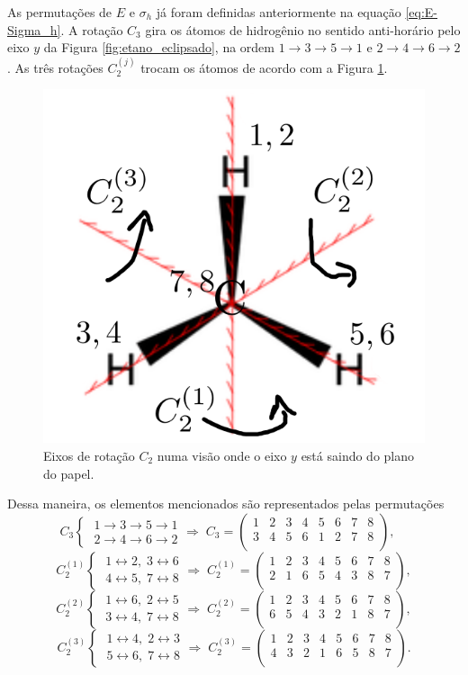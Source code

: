 \documentclass[a4paper,10pt]{article}
\newcommand{\lr}{\leftrightarrow}
\begin{document}
As permutações de $E$ e $\sigma_h$ já foram definidas anteriormente na equação \ref{eq:E-Sigma_h}. A rotação $C_3$ gira os átomos de hidrogênio no sentido anti-horário pelo eixo $y$ da Figura \ref{fig:etano_eclipsado}, na ordem $1 \to 3 \to 5 \to 1$ e $2 \to 4 \to 6 \to 2$. As três rotações $C_2^{(j)}$ trocam os átomos de acordo com a Figura \ref{fig:C2_eclipsado}.
\begin{figure}[H]
\centering
\includegraphics[width=0.3\linewidth]{fig/C2_eclipsado.png}
\caption{Eixos de rotação $C_2$ numa visão onde o eixo $y$ está saindo do plano do papel.}
\label{fig:C2_eclipsado}
\end{figure}

Dessa maneira, os elementos mencionados são representados pelas permutações
$$
C_3
\begin{cases}
\; 1 \to 3 \to 5 \to 1 \\
\; 2 \to 4 \to 6 \to 2
\end{cases}
\Rightarrow \;
C_3 =
\begin{pmatrix}
1 & 2 & 3 & 4 & 5 & 6 & 7 & 8 \\
3 & 4 & 5 & 6 & 1 & 2 & 7 & 8 \\
\end{pmatrix}, \quad
$$
$$
C_2^{(1)}
\begin{cases}
\; 1 \lr 2, \; 3 \lr 6 \\
\; 4 \lr 5, \; 7 \lr 8
\end{cases}
\Rightarrow \;
C_2^{(1)} =
\begin{pmatrix}
1 & 2 & 3 & 4 & 5 & 6 & 7 & 8 \\
2 & 1 & 6 & 5 & 4 & 3 & 8 & 7 \\
\end{pmatrix},
$$
$$
C_2^{(2)}
\begin{cases}
\; 1 \lr 6, \; 2 \lr 5 \\
\; 3 \lr 4, \; 7 \lr 8
\end{cases}
\Rightarrow \;
C_2^{(2)} =
\begin{pmatrix}
1 & 2 & 3 & 4 & 5 & 6 & 7 & 8 \\
6 & 5 & 4 & 3 & 2 & 1 & 8 & 7 \\
\end{pmatrix},
$$
$$
C_2^{(3)}
\begin{cases}
\; 1 \lr 4, \; 2 \lr 3 \\
\; 5 \lr 6, \; 7 \lr 8
\end{cases}
\Rightarrow \;
C_2^{(3)} =
\begin{pmatrix}
1 & 2 & 3 & 4 & 5 & 6 & 7 & 8 \\
4 & 3 & 2 & 1 & 6 & 5 & 8 & 7 \\
\end{pmatrix}.
$$
\end{document}
